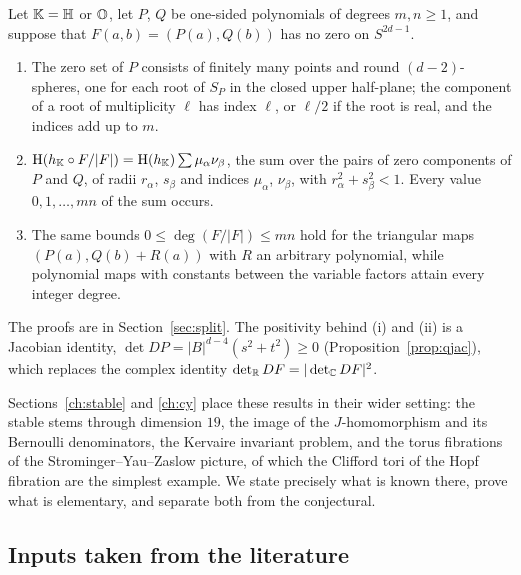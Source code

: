 \begin{maintheorem}\label{thm:G}
Let $\mathbb{K}=\mathbb{H}$ or $\mathbb{O}$, let $P$, $Q$ be one-sided polynomials of degrees $m,n\ge1$, and suppose that $F(a,b)=(P(a),Q(b))$ has no zero on $S^{2d-1}$.
\begin{enumerate}[label=\textup{(\roman*)}]
\item The zero set of $P$ consists of finitely many points and round $(d-2)$-spheres, one for each root of $S_P$ in the closed upper half-plane; the component of a root of multiplicity $\ell$ has index $\ell$, or $\ell/2$ if the root is real, and the indices add up to $m$.
\item $\mathrm{H}(h_{\mathbb{K}}\circ F/|F|)=\mathrm{H}(h_{\mathbb{K}})\sum\mu_\alpha\nu_\beta$, the sum over the pairs of zero components of $P$ and $Q$, of radii $r_\alpha$, $s_\beta$ and indices $\mu_\alpha$, $\nu_\beta$, with $r_\alpha^2+s_\beta^2<1$. Every value $0,1,\dots,mn$ of the sum occurs.
\item The same bounds $0\le\deg(F/|F|)\le mn$ hold for the triangular maps $(P(a),Q(b)+R(a))$ with $R$ an arbitrary polynomial, while polynomial maps with constants between the variable factors attain every integer degree.
\end{enumerate}
\end{maintheorem}

The proofs are in Section~\ref{sec:split}. The positivity behind (i) and (ii) is a Jacobian identity, $\det DP=|B|^{d-4}(s^2+t^2)\ge0$ (Proposition~\ref{prop:qjac}), which replaces the complex identity $\det_{\mathbb{R}} DF=|\det_{\mathbb{C}} DF|^2$.


Sections~\ref{ch:stable} and \ref{ch:cy} place these results in their wider setting: the stable stems through dimension $19$, the image of the $J$-homomorphism and its Bernoulli denominators, the Kervaire invariant problem, and the torus fibrations of the Strominger--Yau--Zaslow picture, of which the Clifford tori of the Hopf fibration are the simplest example. We state precisely what is known there, prove what is elementary, and separate both from the conjectural.

\subsection{Inputs taken from the literature}\label{sec:inputs}

